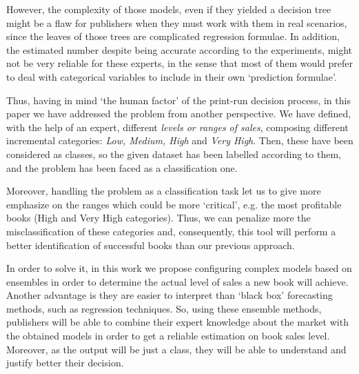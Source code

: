 \documentclass[a4paper,10pt,onecolumn,preprint,3p]{elsarticle}
\begin{document}
However, the complexity of those models, even if they yielded a decision tree might be a flaw for publishers when they must work with them in real scenarios, since the leaves of those trees are complicated regression formulae.
In addition, the estimated number despite being accurate according to the experiments, might not be very reliable for these experts, in the sense that most of them would prefer to deal with categorical variables to include in their own `prediction formulae'.

Thus, having in mind `the human factor' of the print-run decision process, in this paper we have addressed the problem from another perspective. We have defined, with the help of an expert, different \textit{levels or ranges of sales}, composing different incremental categories: \textit{Low, Medium, High} and \textit{Very High}. Then, these have been considered as classes, so the given dataset has been labelled according to them, and the problem has been faced as a classification one.

Moreover, handling the problem as a classification task let us to give more emphasize on the ranges which could be more `critical', e.g. the most profitable books (High and Very High categories). Thus, we can penalize more the misclassification of these categories and, consequently, this tool will perform a better identification of successful books than our previous approach.

In order to solve it, in this work we propose configuring complex models based on ensembles \cite{Qiu2014} in order to determine the actual level of sales a new book will achieve.
Another advantage is they are easier to interpret than `black box' forecasting methods, such as regression techniques. So, using these ensemble methods, publishers will be able to combine their expert knowledge about the 
market with the obtained models in order to get a reliable estimation 
on book sales level. Moreover, as the output will be just a class, they will be able to understand and justify better their decision.

\end{document}
